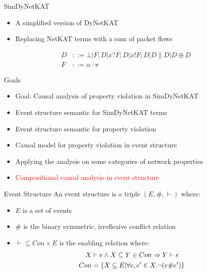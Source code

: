 \begin{frame}{SimDyNetKAT}
    \begin{itemize}
        \item A simplified version of DyNetKAT
        \item Replacing NetKAT terms with a sum of packet flows
    \end{itemize}
    \begin{align*}
        D & ::= \bot | F;D | x?F;D | x!F;D | D \parallel D
        | D \oplus D                                       \\
        F & ::= \alpha\cdot \pi
    \end{align*}
\end{frame}

\begin{frame}{Goals}
    \begin{itemize}
        \item Goal: Causal analysis of property violation in SimDyNetKAT
        \item Event structure semantic for SimDyNetKAT terms
        \item Event structure semantic for property violation
        \item Causal model for property violation in event structure
        \item Applying the analysis on some categories of network
              properties
        \item \textcolor{red} {Compositional causal analysis in
                  event structure}
    \end{itemize}
\end{frame}

\begin{frame}{Event Structure}
    An event structure is a triple $(E,\#,\vdash)$ where:
    \begin{itemize}
        \item $E$ is a set of events
        \item $\#$ is the binary symmetric, irreflexive conflict relation
        \item $\vdash \subseteq Con \times E$ is the enabling relation where:
              \begin{align*}
                  X   & \vdash e \wedge X \subseteq Y \in Con
                  \Rightarrow Y \vdash e                                      \\
                  Con & = \{X \subseteq E| \forall e,e' \in X. \neg(e \#e')\}
              \end{align*}
    \end{itemize}
\end{frame}

